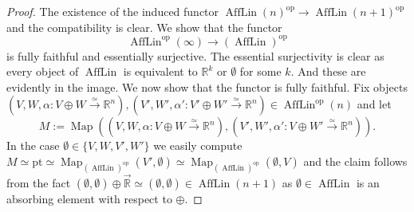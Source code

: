 \documentclass{article}
\newcommand{\xto}{\xrightarrow}
\newcommand{\R}{\mathbb{R}} %
\newcommand{\cO}{\AffLin}
\newcommand{\pt}{\mathrm{pt}}
\newcommand{\op}{\mathrm{op}}
\DeclareMathOperator{\AffLin}{AffLin}
\DeclareMathOperator{\Map}{Map}
\begin{document}
  \begin{proof}
    The existence of the induced functor
    $\cO(n)^\op \to \cO(n+1)^\op$ and the compatibility is clear.
    We show that the functor
    \[
     \AffLin^\op(\infty) \to ({\cO})^\op
    \]
    is fully faithful and essentially surjective.
    The essential surjectivity is clear as every object of $\AffLin$ is 
    equivalent to $\R^k$ or $\emptyset$ for some $k$.
    And these are evidently in the image. 
    We now show that the functor is fully faithful.
    Fix objects $(V,W,\alpha \colon V \oplus W \xto{\simeq} \R^n),
      (V',W',\alpha' \colon V' \oplus W' \xto{\simeq} \R^n) \in \cO^\op(n)$ and let
    \[
      M := \Map((V,W,\alpha \colon V \oplus W \xto{\simeq} \R^{n}),
      (V',W',\alpha' \colon V \oplus W' \xto{\simeq} \R^{n}))
      .\]
    In the case $\emptyset \in \{V,W,V',W'\}$ we easily compute
    $ M \simeq \pt \simeq \Map_{(\cO)^\op}(V',\emptyset) \simeq
      \Map_{(\cO)^\op}(\emptyset, V)$ and the claim follows from the fact
    $(\emptyset,\emptyset) \oplus \overrightarrow{\R} \simeq
      (\emptyset,\emptyset) \in \cO(n+1)$ as $\emptyset \in \cO$
    is an absorbing element with respect to $\oplus$.
  

\end{proof}
\end{document}
